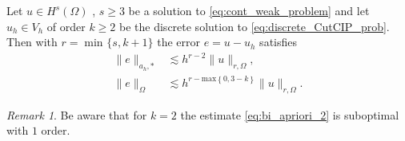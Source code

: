 \documentclass[11pt]{article}
\theoremstyle{remark}
\newtheorem*{remark}{Remark}
\renewcommand{\ge}{\geqslant}
\numberwithin{equation}{section}
\begin{document}
\begin{theorem}
    \label{thm:apriori_result}
    Let $u \in H^{s}( \Omega ) $ , $s\ge 3$ be a solution to \eqref{eq:cont_weak_problem} and let $u_{h} \in V_{h}$ of order $k\ge 2$ be the discrete solution to \eqref{eq:discrete_CutCIP_prob}. Then with $r = \min_{}\{s, k+1\} $ the error $e = u - u_{h}$ satisfies
    \begin{align}
        \label{eq:bi_apriori_1}
            \| e \|_{ a_{h},* }^{  } &\lesssim   h^{r-2} \| u \|_{ r,\Omega  }^{  },\\
        \label{eq:bi_apriori_2}
        \| e \|_{ \Omega  }^{  } &\lesssim   h^{r-\mathrm{max}\left\{ 0, 3-k \right\} } \| u \|_{ r,\Omega  }^{  }.
    \end{align}

\end{theorem}
\begin{remark}
    Be aware that for $k=2$ the estimate \eqref{eq:bi_apriori_2} is suboptimal with $1$ order.
\end{remark}
\end{document}
